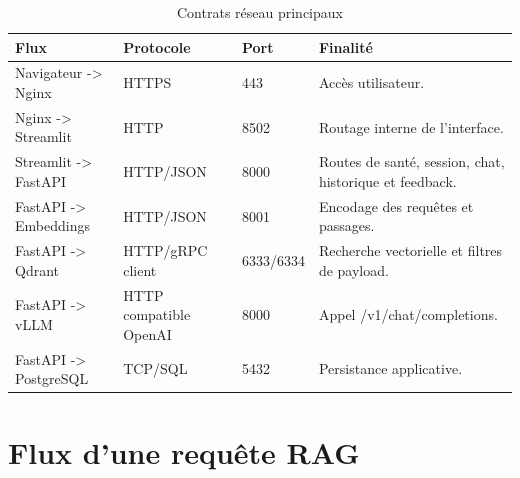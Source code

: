 \begin{table}[H]
\centering
\caption{Contrats réseau principaux}
\label{tab:ports_ch5}
\begin{tabular}{p{3.5cm}p{3.0cm}p{2.0cm}p{5.0cm}}
\toprule
\textbf{Flux} & \textbf{Protocole} & \textbf{Port} & \textbf{Finalité} \\
\midrule
Navigateur -> Nginx & HTTPS & 443 & Accès utilisateur. \\
Nginx -> Streamlit & HTTP & 8502 & Routage interne de l’interface. \\
Streamlit -> FastAPI & HTTP/JSON & 8000 & Routes de santé, session, chat, historique et feedback. \\
FastAPI -> Embeddings & HTTP/JSON & 8001 & Encodage des requêtes et passages. \\
FastAPI -> Qdrant & HTTP/gRPC client & 6333/6334 & Recherche vectorielle et filtres de payload. \\
FastAPI -> vLLM & HTTP compatible OpenAI & 8000 & Appel /v1/chat/completions. \\
FastAPI -> PostgreSQL & TCP/SQL & 5432 & Persistance applicative. \\
\bottomrule
\end{tabular}
\end{table}

\section{Flux d'une requête RAG}

